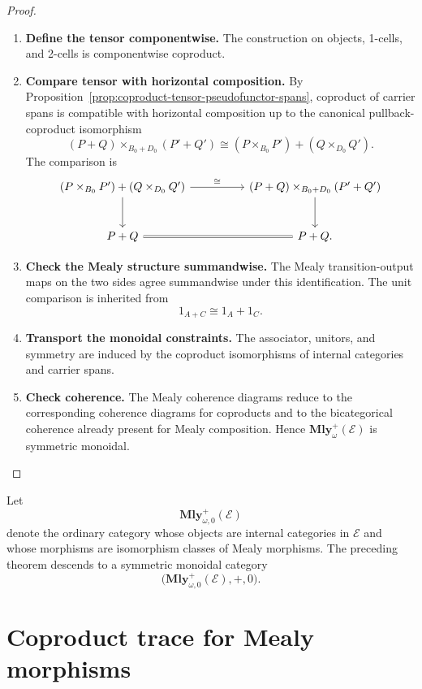 \begin{proof}
\begin{enumerate}
  \item \textbf{Define the tensor componentwise.}
  The construction on objects, 1-cells, and 2-cells is componentwise
  coproduct.

  \item \textbf{Compare tensor with horizontal composition.}
  By Proposition~\ref{prop:coproduct-tensor-pseudofunctor-spans}, coproduct
  of carrier spans is compatible with horizontal composition up to the
  canonical pullback-coproduct isomorphism
  \[
    (P+Q)\times_{B_0+D_0}(P'+Q')
    \cong
    (P\times_{B_0}P')+(Q\times_{D_0}Q').
  \]
  The comparison is
  \[
  \begin{tikzcd}[column sep=huge,row sep=large]
    (P\times_{B_0}P')+(Q\times_{D_0}Q')
      \ar[r,"\cong"]
      \ar[d]
    &
    (P+Q)\times_{B_0+D_0}(P'+Q')
      \ar[d]
    \\
    P+Q
      \ar[r,equal]
    &
    P+Q .
  \end{tikzcd}
  \]

  \item \textbf{Check the Mealy structure summandwise.}
  The Mealy transition-output maps on the two sides agree summandwise under
  this identification. The unit comparison is inherited from
  \[
    1_{A+C}\cong 1_A+1_C.
  \]

  \item \textbf{Transport the monoidal constraints.}
  The associator, unitors, and symmetry are induced by the coproduct
  isomorphisms of internal categories and carrier spans.

  \item \textbf{Check coherence.}
  The Mealy coherence diagrams reduce to the corresponding coherence diagrams
  for coproducts and to the bicategorical coherence already present for Mealy
  composition. Hence \(\mathbf{Mly}^{+}_{\omega}(\mathcal E)\) is symmetric
  monoidal.
\end{enumerate}
\end{proof}

Let
\[
  \mathbf{Mly}^{+}_{\omega,0}(\mathcal E)
\]
denote the ordinary category whose objects are internal categories in
\(\mathcal E\) and whose morphisms are isomorphism classes of Mealy
morphisms. The preceding theorem descends to a symmetric monoidal category
\[
  \bigl(\mathbf{Mly}^{+}_{\omega,0}(\mathcal E),+,0\bigr).
\]

\section{Coproduct trace for Mealy morphisms}
\label{sec:coproduct-trace-mealy}

